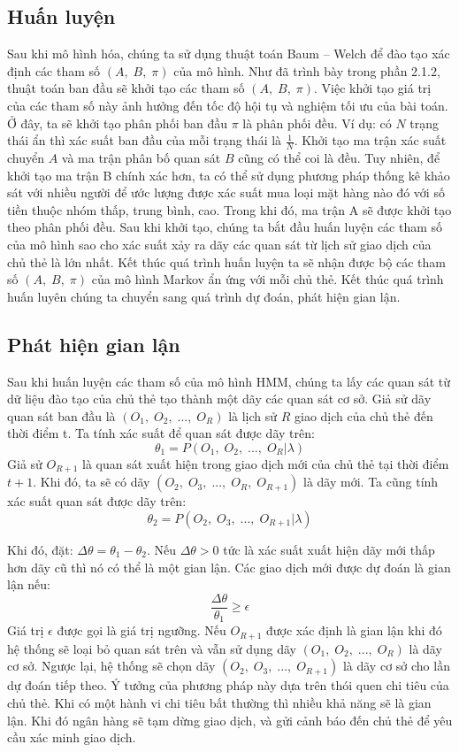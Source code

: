 \subsection{Huấn luyện}
Sau khi mô hình hóa, chúng ta sử dụng thuật toán Baum – Welch để đào tạo xác định các tham số $(A,\; B,\; \pi)$ của mô hình. Như đã trình bày trong phần 2.1.2, thuật toán ban đầu sẽ khởi tạo các tham số $(A,\; B,\; \pi)$. Việc khởi tạo giá trị của các tham số này ảnh hưởng đến tốc độ hội tụ và nghiệm tối ưu của bài toán. Ở đây, ta sẽ khởi tạo phân phối ban đầu $\pi$ là phân phối đều. Ví dụ: có $N$ trạng thái ẩn thì xác suất ban đầu của mỗi trạng thái là $\frac{1}{N}$. Khởi tạo ma trận xác suất chuyển $A$ và ma trận phân bố quan sát $B$ cũng có thể coi là đều. Tuy nhiên, để khởi  tạo ma trận B chính xác hơn, ta có thể sử dụng phương pháp thống kê khảo sát với nhiều người để ước lượng được xác suất mua loại mặt hàng nào đó với số tiền thuộc nhóm thấp, trung bình, cao. Trong khi đó, ma trận A sẽ được khởi tạo theo phân phối đều.
Sau khi khởi tạo, chúng ta bắt đầu huấn luyện các tham số của mô hình sao cho xác suất xảy ra dãy các quan sát từ lịch sử giao dịch của chủ thẻ là lớn nhất. Kết thúc quá trình huấn luyện ta sẽ nhận được bộ các tham số $(A,\; B,\; \pi)$ của mô hình Markov ẩn ứng với mỗi chủ thẻ. Kết thúc quá trình huấn luyên chúng ta chuyển sang quá trình dự đoán, phát hiện gian lận.

\subsection{Phát hiện gian lận}
Sau khi huấn luyện các tham số của mô hình HMM, chúng ta lấy các quan sát từ dữ liệu đào tạo của chủ thẻ tạo thành một dãy các quan sát cơ sở. Giả sử dãy quan sát ban đầu là $(O_1,\; O_2,\; ...,\; O_R)$ là lịch sử $R$ giao dịch của chủ thẻ đến thời điểm t. Ta tính xác suất để quan sát được dãy trên:
$$\theta_1=P(O_1,\; O_2,\; ...,\; O_R|\lambda)$$
Giả sử $O_{R+1}$ là quan sát xuất hiện trong giao dịch mới của chủ thẻ tại thời điểm $t+1$. Khi đó, ta sẽ có dãy $(O_2,\; O_3,\; ...,\; O_R,\; O_{R+1})$ là dãy mới. Ta cũng tính xác suất quan sát được dãy trên:
$$\theta_2=P(O_2,\; O_3,\; ...,\; O_{R+1}|\lambda)$$

Khi đó, đặt: $\Delta \theta = \theta_1 - \theta_2$. Nếu $\Delta \theta > 0$ tức là xác suất xuất hiện dãy mới thấp hơn dãy cũ thì nó có thể là một gian lận. Các giao dịch mới được dự đoán là gian lận nếu:
$$\frac{\Delta \theta}{\theta_1} \geq \epsilon$$
Giá trị $\epsilon$ được gọi là giá trị ngưỡng. Nếu $O_{R+1}$ được xác định là gian lận khi đó hệ thống sẽ loại bỏ quan sát trên và vẫn sử dụng dãy $(O_1,\; O_2,\; ...,\; O_R)$ là dãy cơ sở. Ngược lại, hệ thống sẽ chọn dãy $(O_2,\; O_3,\; ...,\; O_{R+1})$ là dãy cơ sở cho lần dự đoán tiếp theo. Ý tưởng của phương pháp này dựa trên thói quen chi tiêu của chủ thẻ. Khi có một hành vi chi tiêu bất thường thì nhiều khả năng sẽ là gian lận. Khi đó ngân hàng sẽ tạm dừng giao dịch, và gửi cảnh báo đến chủ thẻ để yêu cầu xác minh giao dịch.
